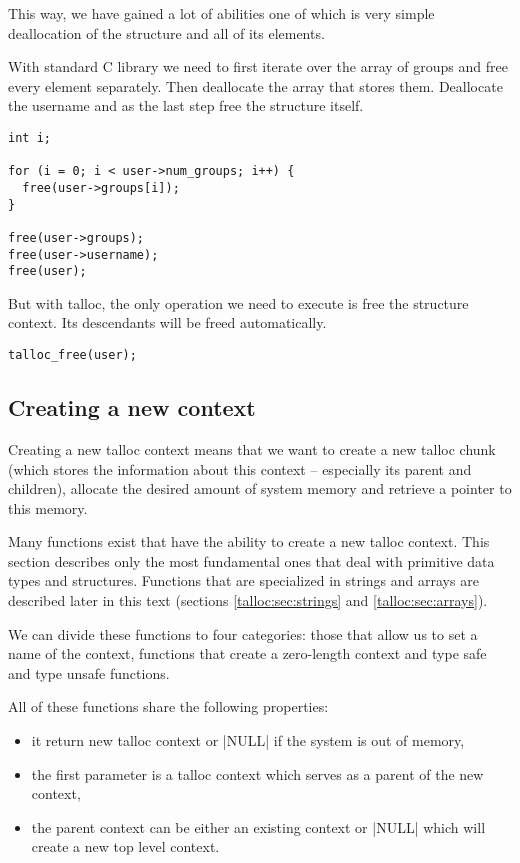 This way, we have gained a lot of abilities one of which is very simple
deallocation of the structure and all of its elements.

With standard C library we need to first iterate over the array of groups and
free every element separately. Then deallocate the array that stores them.
Deallocate the username and as the last step free the structure itself.

\begin{lstlisting}[caption={Freeing struct user -- C standard library},
                   label={lst:free-struct-user-c}]
int i;

for (i = 0; i < user->num_groups; i++) {
  free(user->groups[i]);
}

free(user->groups);
free(user->username);
free(user);
\end{lstlisting}

\noindent
But with talloc, the only operation we need to execute is free the structure
context. Its descendants will be freed automatically.

\begin{lstlisting}[caption={Freeing struct user -- talloc library},
                   label={lst:free-struct-user-talloc}]
talloc_free(user);
\end{lstlisting}

\subsection{Creating a new context}
\label{talloc:subsec:new-context}

Creating a new talloc context means that we want to create a new talloc chunk
(which stores the information about this context -- especially its parent and
children), allocate the desired amount of system memory and retrieve a pointer
to this memory.

Many functions exist that have the ability to create a new talloc context. This
section describes only the most fundamental ones that deal with primitive data
types and structures. Functions that are specialized in strings and arrays are
described later in this text (sections \ref{talloc:sec:strings} and
\ref{talloc:sec:arrays}).

We can divide these functions to four categories: those that allow us to set a
name of the context, functions that create a zero-length context and type safe
and type unsafe functions.

All of these functions share the following properties:
\begin{itemize}
  \item it return new talloc context or |NULL| if the system is out of memory,
  \item the first parameter is a talloc context which serves as a parent of
  the new context,
  \item the parent context can be either an existing context or |NULL| which
  will create a new top level context.
\end{itemize}

